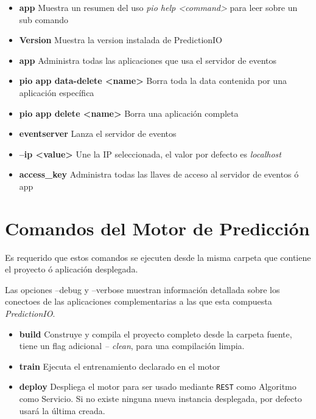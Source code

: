 \begin{itemize}
	\item \textbf{app} Muestra un resumen del uso  \emph{pio help <command>} para leer sobre un sub comando
	
	\item \textbf{Version} Muestra la version instalada de PredictionIO
	
	
	\item \textbf{app }  Administra todas las aplicaciones que usa el servidor de eventos
	\item \textbf{pio app data-delete <name> } Borra toda la data contenida por una aplicación específica
	\item \textbf{pio app delete <name> }  Borra una aplicación completa
	\item \textbf{eventserver }  Lanza el servidor de eventos
	\item \textbf{ --ip <value> } Une la IP seleccionada, el valor por defecto es \emph{localhost}
	\item \textbf{access\_key} Administra todas las llaves de acceso al servidor de eventos ó app
	
\end{itemize}


\section {Comandos del Motor de Predicción}

Es requerido que estos comandos se ejecuten desde la misma carpeta que contiene el proyecto ó aplicación desplegada.

Las opciones  --debug y --verbose  muestran información detallada sobre los conectoes de las aplicaciones complementarias a las que esta compuesta \emph{PredictionIO}.

\begin{itemize}
	\item \textbf{build} Construye y compila el proyecto completo desde la carpeta fuente, tiene un flag adicional \emph{-- clean}, para una compilación limpia.

	\item \textbf{train} Ejecuta el entrenamiento declarado en el motor 

	\item \textbf{deploy} Despliega el motor para ser usado mediante \texttt{REST} como Algoritmo como Servicio. Si no existe ninguna nueva instancia  desplegada, por defecto usará la última creada.
	
\end{itemize}


